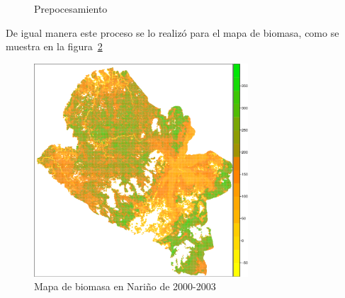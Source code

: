 \begin{figure}
  \centering
  \vfill
  \caption{Prepocesamiento}
  \label{fig:Recortar imágenes}
\end{figure}

De igual manera este proceso se lo realizó para el mapa de biomasa, como se muestra en la figura~\ref{fig:mapaNarino}

\begin{figure}
  \centering
  \includegraphics[width = 8cm]{mapaNarino.pdf}
  \caption{Mapa de biomasa en Nariño de 2000-2003 \cite{baccini2008afirst}}
  \label{fig:mapaNarino}
\end{figure}

